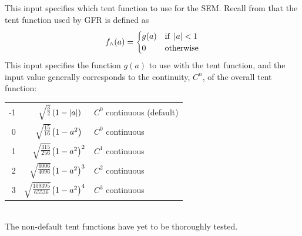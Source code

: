 \begin{nmldescbody}
This input specifies which tent function to use for the SEM.
%
Recall from  that the tent function
used by GFR is defined as
%
\begin{equation*}
  f_{\wedge}(a) = 
  \begin{cases}
    g(a) & \text{if } \left|a\right| < 1 \\
    0    & \text{otherwise}
  \end{cases}
\end{equation*}
%
This input specifies the function $g(a)$ to use with the tent function, and the
input value generally corresponds to the continuity, $C^n$, of the overall tent
function:\\[-5pt]

\begin{tabular}{ @{} r @{ \qquad $g(a)=$} rl @{\quad : } l @{} }
  -1 & $\sqrt{\tfrac{     3}{    2}}$ & $\mspace{-17mu}\left(1-\left|a\right|\right)$ & $C^0$ continuous (default) \\[5pt]
   0 & $\sqrt{\tfrac{    15}{   16}}$ & $\mspace{-17mu}\left(1-a^2\right)$     & $C^0$ continuous  \\[5pt]
   1 & $\sqrt{\tfrac{   315}{  256}}$ & $\mspace{-17mu}\left(1-a^2\right)^2$   & $C^1$ continuous  \\[5pt]
   2 & $\sqrt{\tfrac{  6006}{ 4096}}$ & $\mspace{-17mu}\left(1-a^2\right)^3$   & $C^2$ continuous  \\[5pt]
   3 & $\sqrt{\tfrac{109395}{65536}}$ & $\mspace{-17mu}\left(1-a^2\right)^4$   & $C^3$ continuous
\end{tabular}
\\[5pt]
\NOTE
The non-default tent functions have yet to be thoroughly tested.
\end{nmldescbody}


